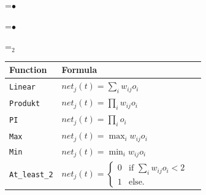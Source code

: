 {\newpage
\clearpage
\samepage \setbox\sizebox=\hbox{$\bullet$}\box\sizebox
}

{\newpage
\clearpage
\samepage \setbox\sizebox=\hbox{$\bullet$}\box\sizebox
}

{\newpage
\clearpage
\samepage \setbox\sizebox=\hbox{$_2$}\box\sizebox
}

{\newpage
\clearpage
\samepage \begin{table}[h]
\begin{center}
\begin{tabular}{|l|l|r|}     \hline
{\bf Function} & {\bf Formula}\\  \hline \hline
{\tt Linear}      & $net_j(t) = \sum_{i} {w_{ij}o_i}$ \\  \hline
{\tt Produkt}     & $net_j(t) = \prod_{i} {w_{ij}o_i}$ \\  \hline
{\tt PI}          & $net_j(t) = \prod_{i} {o_i}$ \\  \hline
{\tt Max}         & $net_j(t) = \max_{i} {w_{ij}o_i}$ \\  \hline
{\tt Min}         & $net_j(t) = \min_{i} {w_{ij}o_i}$ \\  \hline
{\tt At\_least\_2}  & $net_j(t) = \left\{ \begin{array}{ll}
                                     0 & \mbox{if } \sum_{i} {w_{ij}o_i} < 2 \\ 
                                     1 & \mbox{else.}
                                  \end{array}
                          \right.$ \\  \hline
\end{tabular}
\end{center}
\end{table}
}

